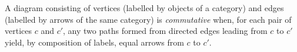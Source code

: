 A diagram consisting of vertices (labelled by objects of a category) and edges (labelled by arrows of the same category) is \emph{commutative} when, for each pair of vertices $c$ and $c'$, any two paths formed from directed edges leading from $c$ to $c'$ yield, by composition of labels, equal arrows from $c$ to $c'$.
